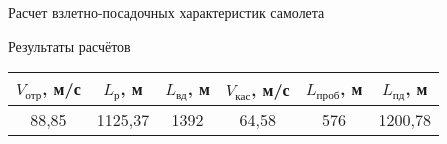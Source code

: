 \begin{frame}{Расчет взлетно-посадочных характеристик самолета}
    \begin{block}{Результаты расчётов}
    \begin{table}
        \begin{tabular}{|c|c|c|c|c|c|}
            \hline
            $V_\text{отр}$, м/с& $L_\text{р}$, м & $L_\text{вд}$, м & $V_\text{кас}$, м/с & $L_\text{проб}$, м & $L_\text{пд}$, м\\ \hline
            88,85& 1125,37 & 1392 & 64,58 & 576 & 1200,78\\ \hline
        \end{tabular}
    \end{table}
\end{block}
\end{frame}
